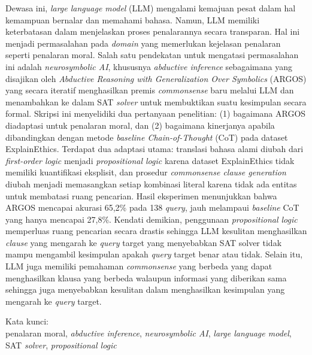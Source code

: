 \noindent Dewasa ini, \textit{large language model} (LLM) mengalami kemajuan pesat dalam hal kemampuan bernalar dan memahami bahasa. Namun, LLM memiliki keterbatasan dalam menjelaskan proses penalarannya secara transparan. Hal ini menjadi permasalahan pada \textit{domain} yang memerlukan kejelasan penalaran seperti penalaran moral. Salah satu pendekatan untuk mengatasi permasalahan ini adalah \textit{neurosymbolic AI}, khususnya \textit{abductive inference} sebagaimana yang disajikan oleh \textit{Abductive Reasoning with Generalization Over Symbolics} (ARGOS) yang secara iteratif menghasilkan premis \textit{commonsense} baru melalui LLM dan menambahkan ke dalam SAT \textit{solver} untuk membuktikan suatu kesimpulan secara formal. Skripsi ini menyelidiki dua pertanyaan penelitian: (1) bagaimana ARGOS diadaptasi untuk penalaran moral, dan (2) bagaimana kinerjanya apabila dibandingkan dengan metode \textit{baseline Chain-of-Thought} (CoT) pada dataset ExplainEthics. Terdapat dua adaptasi utama: translasi bahasa alami diubah dari \textit{first-order logic} menjadi \textit{propositional logic} karena dataset ExplainEthics tidak memiliki kuantifikasi eksplisit, dan prosedur \textit{commonsense clause generation} diubah menjadi memasangkan setiap kombinasi literal karena tidak ada entitas untuk membatasi ruang pencarian. Hasil eksperimen menunjukkan bahwa ARGOS mencapai akurasi 65,2\% pada 138 \textit{query}, jauh melampaui \textit{baseline} CoT yang hanya mencapai 27,8\%. Kendati demikian, penggunaan \textit{propositional logic} memperluas ruang pencarian secara drastis sehingga LLM kesulitan menghasilkan \textit{clause} yang mengarah ke \textit{query} target yang menyebabkan SAT solver tidak mampu mengambil kesimpulan apakah \textit{query} target benar atau tidak. Selain itu, LLM juga memiliki pemahaman \textit{commonsense} yang berbeda yang dapat menghasilkan klausa yang berbeda walaupun informasi yang diberikan sama sehingga juga menyebabkan kesulitan dalam menghasilkan kesimpulan yang mengarah ke \textit{query} target.

\vspace*{0.2cm}

\noindent Kata kunci: \\ penalaran moral, \textit{abductive inference}, \textit{neurosymbolic AI}, \textit{large language model}, SAT \textit{solver}, \textit{propositional logic} \\

\newpage
